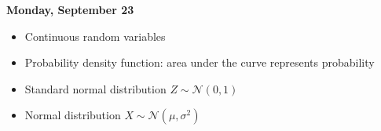 \documentclass[11pt]{article}
\begin{document}
\noindent\textbf{\large Monday, September 23} 	

\begin{itemize}










	






%
%
%
%
%
%	
%

	

%


\item Continuous random variables
\item Probability density function: area under the curve represents probability
\item Standard normal distribution $Z\sim\mathcal{N}(0,1)$


\item Normal distribution $X\sim\mathcal{N}(\mu,\sigma^2)$




\end{itemize}
\end{document}
